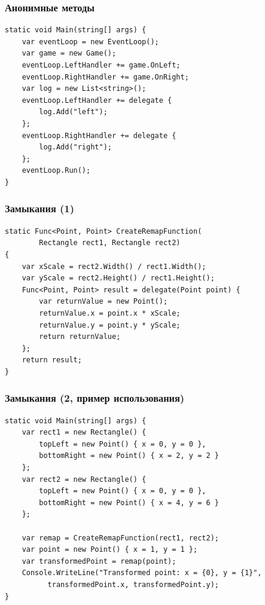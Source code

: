 \documentclass[xetex,mathserif,serif]{beamer}
\begin{document}
    \begin{frame}[fragile]
        \frametitle{Анонимные методы}
        \begin{verbatim}
static void Main(string[] args) {
    var eventLoop = new EventLoop();
    var game = new Game();
    eventLoop.LeftHandler += game.OnLeft;
    eventLoop.RightHandler += game.OnRight;
    var log = new List<string>();
    eventLoop.LeftHandler += delegate {
        log.Add("left");
    };
    eventLoop.RightHandler += delegate {
        log.Add("right");
    };
    eventLoop.Run();
}
        \end{verbatim}
    \end{frame}

    \begin{frame}[fragile]
        \frametitle{Замыкания (1)}
        \begin{verbatim}
static Func<Point, Point> CreateRemapFunction(
        Rectangle rect1, Rectangle rect2)
{
    var xScale = rect2.Width() / rect1.Width();
    var yScale = rect2.Height() / rect1.Height();
    Func<Point, Point> result = delegate(Point point) {
        var returnValue = new Point();
        returnValue.x = point.x * xScale;
        returnValue.y = point.y * yScale;
        return returnValue;
    };
    return result;
}
        \end{verbatim}
    \end{frame}

    \begin{frame}[fragile]
        \frametitle{Замыкания (2, пример использования)}
        \begin{small}
            \begin{verbatim}
static void Main(string[] args) {
    var rect1 = new Rectangle() {
        topLeft = new Point() { x = 0, y = 0 },
        bottomRight = new Point() { x = 2, y = 2 }
    };
    var rect2 = new Rectangle() {
        topLeft = new Point() { x = 0, y = 0 },
        bottomRight = new Point() { x = 4, y = 6 }
    };

    var remap = CreateRemapFunction(rect1, rect2);
    var point = new Point() { x = 1, y = 1 };
    var transformedPoint = remap(point);
    Console.WriteLine("Transformed point: x = {0}, y = {1}", 
          transformedPoint.x, transformedPoint.y);
}
            \end{verbatim}
        \end{small}
    \end{frame}
\end{document}
